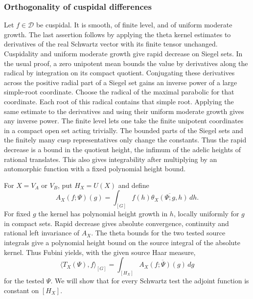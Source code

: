\subsubsection{Orthogonality of cuspidal differences}
Let \(f\in\mathscr D\) be cuspidal. It is smooth, of finite level,
and of uniform moderate growth. The last assertion follows by
applying the theta kernel estimates to derivatives of the real
Schwartz vector with its finite tensor unchanged. Cuspidality and
uniform moderate growth give rapid decrease on Siegel sets. In the
usual proof, a zero unipotent mean bounds the value by derivatives
along the radical by integration on its compact quotient. Conjugating
these derivatives across the positive radial part of a Siegel set
gains an inverse power of a large simple-root coordinate. Choose the
radical of the maximal parabolic for that coordinate. Each root of
this radical contains that simple root. Applying the same estimate
to the derivatives and using their uniform moderate growth gives any
inverse power. The finite level lets one take the finite unipotent
coordinates in a compact open set acting trivially. The bounded
parts of the Siegel sets and the finitely many cusp representatives
only change the constants. Thus the rapid decrease is a bound in
the quotient height, the infimum of the adelic heights of rational
translates. This also gives integrability after multiplying by an
automorphic function with a fixed polynomial height bound.

For \(X=V_A\) or \(V_B\), put \(H_X=U(X)\) and define
\[
 A_X(f;\Psi)(g)=\int_{[G]} f(h)\overline{\theta_X(\Psi;g,h)}\,dh.
\]
For fixed \(g\) the kernel has polynomial height growth in \(h\),
locally uniformly for \(g\) in compact sets. Rapid decrease gives
absolute convergence, continuity and rational left invariance of
\(A_X\). The theta bounds for the two tested source integrals give
a polynomial height bound on the source integral of the absolute
kernel. Thus Fubini yields, with the given source Haar measure,
\[
  \langle T_X(\Psi),f\rangle_{[G]}
   =\int_{[H_X]} \overline{A_X(f;\Psi)(g)}\,dg
\]
for the tested \(\Psi\). We will show that for every Schwartz test
the adjoint function is constant on \([H_X]\).

